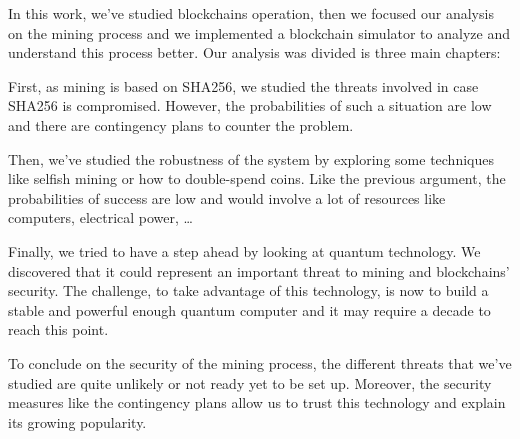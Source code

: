 In this work, we've studied blockchains operation, then we focused our analysis on the mining process and we implemented a blockchain simulator to analyze and understand this process better. Our analysis was divided is three main chapters:\newline

First, as mining is based on SHA256, we studied the threats involved in case SHA256 is compromised. However, the probabilities of such a situation are low and there are contingency plans to counter the problem. \newline

Then, we've studied the robustness of the system by exploring some techniques like selfish mining or how to double-spend coins. Like the previous argument, the probabilities of success are low and would involve a lot of resources like computers, electrical power, … \newline

Finally, we tried to have a step ahead by looking at quantum technology. We discovered that it could represent an important threat to mining and blockchains' security. The challenge, to take advantage of this technology, is now to build a stable and powerful enough quantum computer and it may require a decade to reach this point. \newline

To conclude on the security of the mining process, the different threats that we've studied are quite unlikely or not ready yet to be set up. Moreover, the security measures like the contingency plans allow us to trust this technology and explain its growing popularity.
